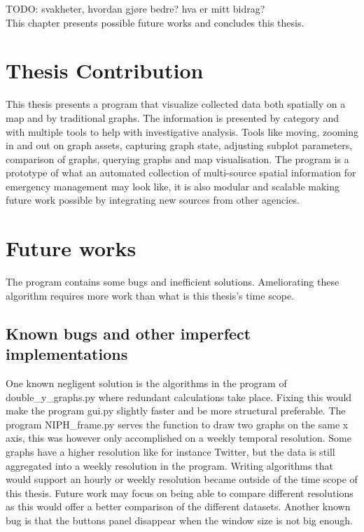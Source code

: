 TODO: svakheter, hvordan gjøre bedre? hva er mitt bidrag?  \\

This chapter presents possible future works and concludes this thesis.

\section{Thesis Contribution}
This thesis presents a program that visualize collected data both spatially on a map and by traditional graphs. The information is presented by category and with multiple tools to help with investigative analysis. Tools like moving, zooming in and out on graph assets, capturing graph state, adjusting subplot parameters, comparison of graphs, querying graphs and map visualisation. The program is a prototype of what an automated collection of multi-source spatial information for emergency management may look like, it is also modular and scalable making future work possible by integrating new sources from other agencies.

\section{Future works}
The program contains some bugs and inefficient solutions. Ameliorating these algorithm requires more work than what is this thesis's time scope.

\subsection{Known bugs and other imperfect implementations}
One known negligent solution is the algorithms in the program of double\_y\_graphs.py where redundant calculations take place. Fixing this would make the program gui.py slightly faster and be more structural preferable.
The program NIPH\_frame.py serves the function to draw two graphs on the same x axis, this was however only accomplished on a weekly temporal resolution. Some graphs have a higher resolution like for instance Twitter, but the data is still aggregated into a weekly resolution in the program. Writing algorithms that would support an hourly or weekly resolution became outside of the time scope of this thesis. Future work may focus on being able to compare different resolutions as this would offer a better comparison of the different datasets. 
Another known bug is that the buttons panel disappear when the window size is not big enough.

